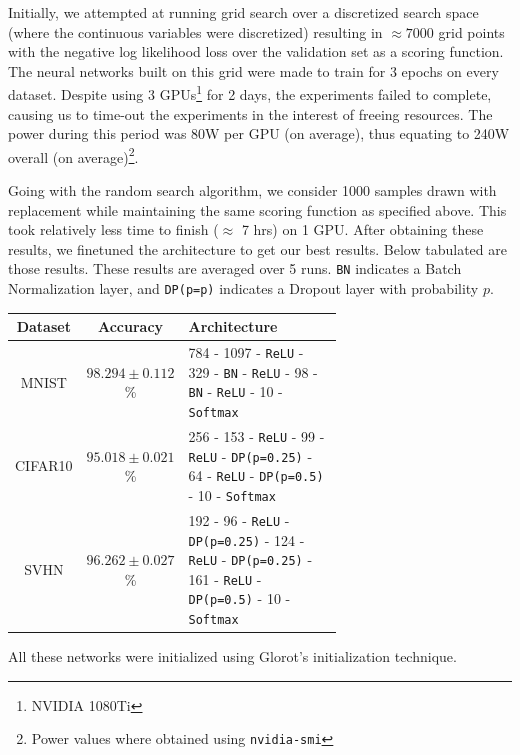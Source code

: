 \documentclass[12pt]{article}
\newcommand{\pbreak}{\vspace{4mm}}
\begin{document}
\begin{flushleft}
Initially, we attempted at running grid search over a discretized search space (where the continuous variables were discretized) resulting in \(\approx 7000\) grid points with the negative log likelihood loss over the validation set as a scoring function. The neural networks built on this grid were made to train for 3 epochs on every dataset. Despite using 3 GPUs\footnote{NVIDIA 1080Ti} for 2 days, the experiments failed to complete, causing us to time-out the experiments in the interest of freeing resources. The power during this period was 80W per GPU (on average), thus equating to 240W overall (on average)\footnote{Power values where obtained using \texttt{nvidia-smi}}.
\pbreak

Going with the random search algorithm, we consider 1000 samples drawn with replacement while maintaining the same scoring function as specified above. This took relatively less time to finish (\(\approx\) 7 hrs) on 1 GPU. After obtaining these results, we finetuned the architecture to get our best results. Below tabulated are those results. These results are averaged over 5 runs. \texttt{BN} indicates a Batch Normalization layer, and \texttt{DP(p=p)} indicates a Dropout layer with probability \(p\).
\begin{center}
\begin{tabular}{|c|c|p{0.65\linewidth}|}
\hline
\textbf{Dataset} & \textbf{Accuracy} & \textbf{Architecture}\\
\hline
\hline
MNIST & \(98.294 \pm 0.112\)\% & 784 - 1097 - \texttt{ReLU} - 329 - \texttt{BN} - \texttt{ReLU} - 98 - \texttt{BN} - \texttt{ReLU} - 10 - \texttt{Softmax}\\
\hline
CIFAR10 & \(95.018 \pm 0.021\)\% & 256 - 153 - \texttt{ReLU} - 99 - \texttt{ReLU} - \texttt{DP(p=0.25)} - 64 - \texttt{ReLU} - \texttt{DP(p=0.5)} - 10 - \texttt{Softmax}\\
\hline
SVHN & \(96.262 \pm 0.027\)\% & 192 - 96 - \texttt{ReLU} - \texttt{DP(p=0.25)} - 124 - \texttt{ReLU} - \texttt{DP(p=0.25)} - 161 - \texttt{ReLU} - \texttt{DP(p=0.5)} - 10 - \texttt{Softmax}\\
\hline
\end{tabular}
\end{center}

All these networks were initialized using Glorot's initialization technique.
\end{flushleft}
\end{document}
